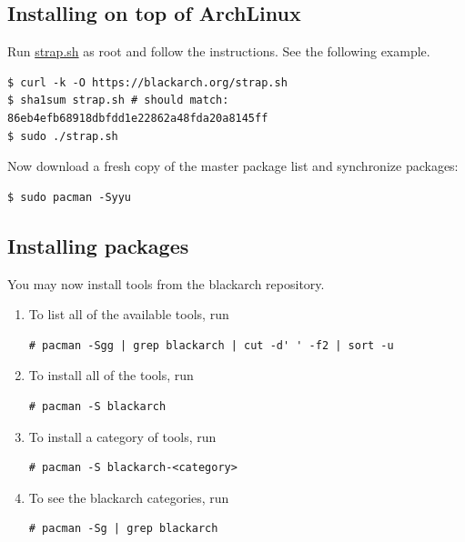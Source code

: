\documentclass[a4paper, oneside, 11pt]{book}
\begin{document}
\subsection{Installing on top of ArchLinux}
Run \href{https://blackarch.org/strap.sh}{strap.sh} as root and follow the
instructions. See the following example.
{\small
\color{gray}
\begin{verbatim}
$ curl -k -O https://blackarch.org/strap.sh
$ sha1sum strap.sh # should match: 86eb4efb68918dbfdd1e22862a48fda20a8145ff
$ sudo ./strap.sh
\end{verbatim}
}
Now download a fresh copy of the master package list and synchronize packages:
{\small
\color{gray}
\begin{verbatim}
$ sudo pacman -Syyu
\end{verbatim}
}

\subsection{Installing packages}
You may now install tools from the blackarch repository.
\begin{enumerate}
\item To list all of the available tools, run
{\small
\color{gray}
\begin{verbatim}
# pacman -Sgg | grep blackarch | cut -d' ' -f2 | sort -u
\end{verbatim}
}
\item To install all of the tools, run
{\small
\color{gray}
\begin{verbatim}
# pacman -S blackarch
\end{verbatim}
}
\item To install a category of tools, run
{\small
\color{gray}
\begin{verbatim}
# pacman -S blackarch-<category>
\end{verbatim}
}
\item To see the blackarch categories, run
{\small
\color{gray}
\begin{verbatim}
# pacman -Sg | grep blackarch
\end{verbatim}
}
\end{enumerate}
\end{document}
